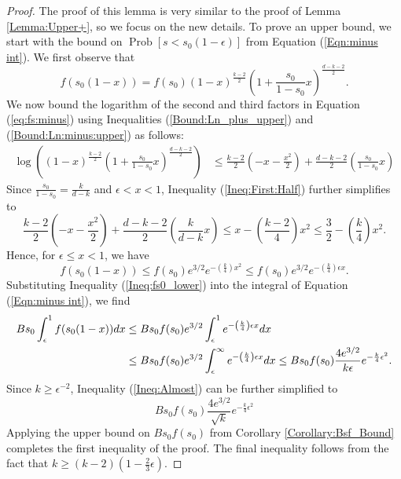 \documentclass[twoside,11pt]{article}
\newcommand{\pP}[1]{\operatorname{Prob}\left[ #1 \right] }
\begin{document}
		\begin{proof}
				The proof of this lemma is very similar to the proof of Lemma \ref{Lemma:Upper+}, so we focus on the new details.
				To prove an upper bound, we start with the bound on $\pP{s<s_0(1-\epsilon)}$ from Equation (\ref{Eqn:minus int}).
				We first observe that 
				\begin{equation}\label{eq:fs:minus}
							f(s_0(1-x))  = f(s_0) (1-x)^{\frac{k-2}{2}} \left( 1+ \frac{s_0}{1-s_0}x\right)^{\frac{d-k-2}{2}}.
						\end{equation}
We now bound the logarithm of the second and third factors in Equation (\ref{eq:fs:minus}) using Inequalities (\ref{Bound:Ln_plus_upper}) and (\ref{Bound:Ln:minus:upper}) as follows:
						\begin{align} 
						\log \left( (1-x)^{\frac{k-2}{2}}  \left( 1+ \frac{s_0}{1-s_0}x\right)^{\frac{d-k-2}{2}} \right)						& \leq \frac{k-2}{2} \left(-x-\frac{x^2}{2}\right) + \frac{d-k-2}{2} \left( \frac{s_0}{1-s_0}x \right)\label{Ineq:First:Half}
						\end{align}
						Since $\frac{s_0}{1-s_0}=\frac{k}{d-k}$ and $\epsilon<x<1$, Inequality (\ref{Ineq:First:Half}) further simplifies to 				
						$$
						\frac{k-2}{2} \left(-x-\frac{x^2}{2}\right) + \frac{d-k-2}{2} \left( \frac{k}{d-k}x \right) \leq  x -\left(\frac{k-2}{4}\right)x^2  \leq \frac{3}{2} - \left(\frac{k}{4}\right)x^2.
						$$
						Hence, for $\epsilon \leq x < 1$, we have
						\begin{equation} \label{Ineq:fs0_lower}
							 f(s_0(1-x)) \leq f(s_0) e^{3/2} e^{-\left(\frac{k}{4}\right)x^2} \leq  f(s_0) e^{3/2} e^{-\left(\frac{k}{4}\right)\epsilon x }.
						\end{equation}						
						Substituting Inequality (\ref{Ineq:fs0_lower}) into the integral of Equation (\ref{Eqn:minus int}), we find
						\begin{align}
						Bs_0\int_\epsilon^1f(s_0(1-x))dx
						&\leq Bs_0f(s_0)e^{3/2}\int_\epsilon^1 e^{-\left(\frac{k}{4}\right)\epsilon x}dx\notag\\
						&\leq Bs_0f(s_0)e^{3/2}\int_\epsilon^\infty e^{-\left(\frac{k}{4}\right)\epsilon x}dx
						\leq Bs_0f(s_0) \frac{4e^{3/2}}{k\epsilon}  e^{-\frac{k}{4}\epsilon^2}.\label{Ineq:Almost}
						\end{align}
						Since $k\geq\epsilon^{-2}$, Inequality (\ref{Ineq:Almost}) can be further simplified to
						$$
						Bs_0f(s_0) \frac{4e^{3/2}}{\sqrt{k}} e^{-\frac{k}{4}\epsilon^2}
						$$
						Applying the upper bound on $Bs_0f(s_0)$ from Corollary 
					\ref{Corollary:Bsf_Bound} completes the first inequality of the proof.  
					The final inequality follows from the fact that $k\geq (k-2)\left(1-\frac{2}{3}\epsilon\right)$.				
				\end{proof}
	
\end{document}

